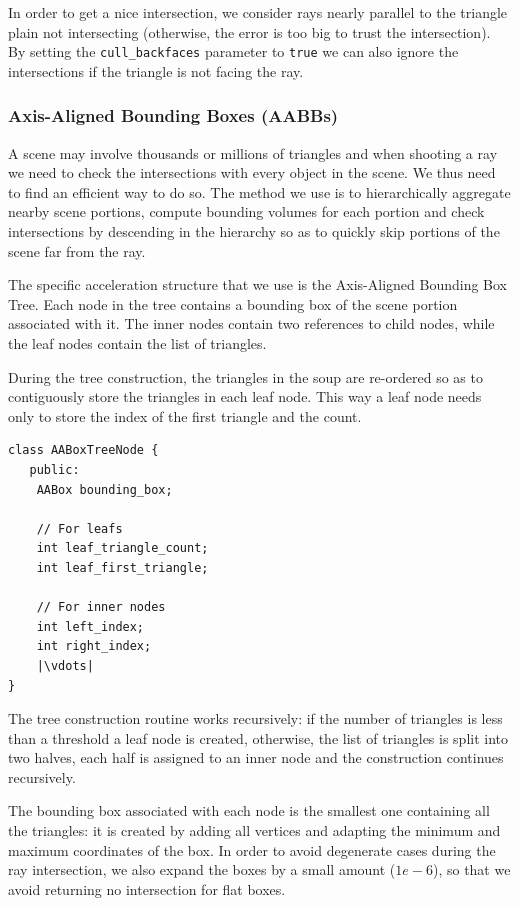 \documentclass[tikz,14pt,fleqn]{article}
\begin{document}
In order to get a nice intersection, we consider rays nearly parallel to the triangle plain not intersecting (otherwise, the error is too big to trust the intersection).
By setting the \texttt{cull_backfaces} parameter to \texttt{true} we can also ignore the intersections if the triangle is not facing the ray.

\subsubsection{Axis-Aligned Bounding Boxes (AABBs)}
A scene may involve thousands or millions of triangles and when shooting a ray we need to check the intersections with every object in the scene. We thus need to find an efficient way to do so.
The method we use is to hierarchically aggregate nearby scene portions, compute bounding volumes for each portion and check intersections by descending in the hierarchy so as to quickly skip portions of the scene far from the ray.

The specific acceleration structure that we use is the Axis-Aligned Bounding Box Tree. Each node in the tree contains a bounding box of the scene portion associated with it. The inner nodes contain two references to child nodes, while the leaf nodes contain the list of triangles. 

During the tree construction, the triangles in the soup are re-ordered so as to contiguously store the triangles in each leaf node. This way a leaf node needs only to store the index of the first triangle and the count.

\begin{verbatim}
class AABoxTreeNode {
   public:
    AABox bounding_box;

    // For leafs
    int leaf_triangle_count;
    int leaf_first_triangle;

    // For inner nodes
    int left_index;
    int right_index;
    |\vdots|
}
\end{verbatim}

The tree construction routine works recursively: if the number of triangles is less than a threshold a leaf node is created, otherwise, the list of triangles is split into two halves, each half is assigned to an inner node and the construction continues recursively.

The bounding box associated with each node is the smallest one containing all the triangles: it is created by adding all vertices and adapting the minimum and maximum coordinates of the box.
In order to avoid degenerate cases during the ray intersection, we also expand the boxes by a small amount ($1e-6$), so that we avoid returning no intersection for flat boxes.
\end{document}
